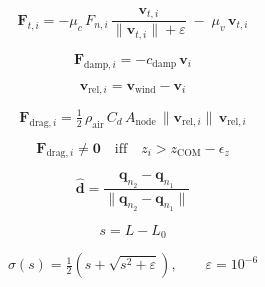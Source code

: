 \begin{equation}
\label{eq:friction}
\mathbf{F}_{t,i} = -\mu_c\,F_{n,i}\,
\frac{\mathbf{v}_{t,i}}{\|\mathbf{v}_{t,i}\| + \varepsilon}
\;-\; \mu_v\,\mathbf{v}_{t,i}
\end{equation}

\begin{equation}
\label{eq:struct_damp}
\mathbf{F}_{\mathrm{damp},i} = -c_{\mathrm{damp}}\,\mathbf{v}_i
\end{equation}



\begin{equation}
\label{eq:v_rel}
\mathbf{v}_{\mathrm{rel},i} = \mathbf{v}_{\mathrm{wind}} - \mathbf{v}_i
\end{equation}

\begin{equation}
\label{eq:wind_force}
\mathbf{F}_{\mathrm{drag},i} = \tfrac{1}{2}\,\rho_{\mathrm{air}}\,C_d\,
A_{\mathrm{node}}\,\|\mathbf{v}_{\mathrm{rel},i}\|\,\mathbf{v}_{\mathrm{rel},i}
\end{equation}

\begin{equation}
\label{eq:wind_condition}
\mathbf{F}_{\mathrm{drag},i} \neq \mathbf{0} \quad
\text{iff} \quad z_i > z_{\mathrm{COM}} - \epsilon_z
\end{equation}



\begin{equation}
\label{eq:cable_dir}
\hat{\mathbf{d}} = \frac{\mathbf{q}_{n_2} - \mathbf{q}_{n_1}}
{\|\mathbf{q}_{n_2} - \mathbf{q}_{n_1}\|}
\end{equation}

\begin{equation}
\label{eq:slack}
s = L - L_0
\end{equation}

\begin{equation}
\label{eq:softplus}
\sigma(s) = \tfrac{1}{2}\!\left(s + \sqrt{s^2 + \varepsilon}\right),
\qquad \varepsilon = 10^{-6}
\end{equation}


